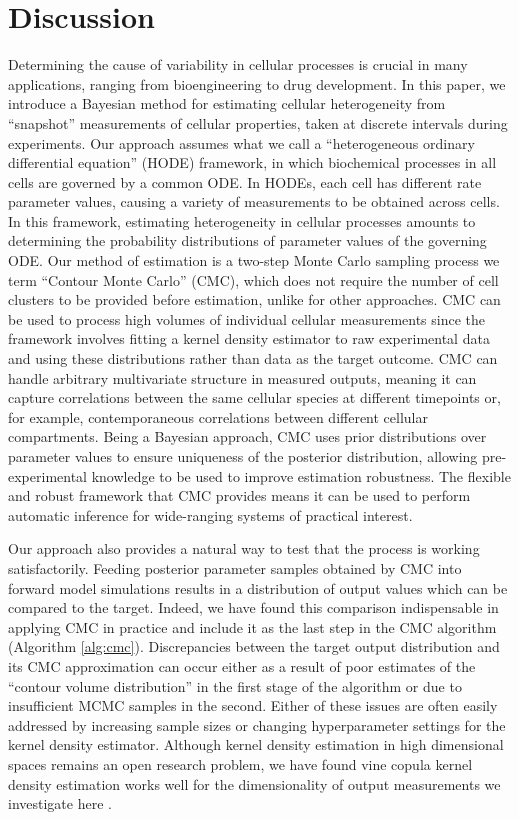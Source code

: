\section{Discussion}
\label{sec:discussion}
Determining the cause of variability in cellular processes is crucial in many applications, ranging from bioengineering to drug development. In this paper, we introduce a Bayesian method for estimating cellular heterogeneity from ``snapshot'' measurements of cellular properties, taken at discrete intervals during experiments. Our approach assumes what we call a ``heterogeneous ordinary differential equation'' (HODE) framework, in which biochemical processes in all cells are governed by a common ODE. In HODEs, each cell has different rate parameter values, causing a variety of measurements to be obtained across cells. In this framework, estimating heterogeneity in cellular processes amounts to determining the probability distributions of parameter values of the governing ODE. Our method of estimation is a two-step Monte Carlo sampling process we term ``Contour Monte Carlo'' (CMC), which does not require the number of cell clusters to be provided before estimation, unlike for other approaches. CMC can be used to process high volumes of individual cellular measurements since the framework involves fitting a kernel density estimator to raw experimental data and using these distributions rather than data as the target outcome. CMC can handle arbitrary multivariate structure in measured outputs, meaning it can capture correlations between the same cellular species at different timepoints or, for example, contemporaneous correlations between different cellular compartments. Being a Bayesian approach, CMC uses prior distributions over parameter values to ensure uniqueness of the posterior distribution, allowing pre-experimental knowledge to be used to improve estimation robustness. The flexible and robust framework that CMC provides means it can be used to perform automatic inference for wide-ranging systems of practical interest.

Our approach also provides a natural way to test that the process is working satisfactorily. Feeding posterior parameter samples obtained by CMC into forward model simulations results in a distribution of output values which can be compared to the target. Indeed, we have found this comparison indispensable in applying CMC in practice and include it as the last step in the CMC algorithm (Algorithm \ref{alg:cmc}). Discrepancies between the target output distribution and its CMC approximation can occur either as a result of poor estimates of the ``contour volume distribution'' in the first stage of the algorithm or due to insufficient MCMC samples in the second. Either of these issues are often easily addressed by increasing sample sizes or changing hyperparameter settings for the kernel density estimator. Although kernel density estimation in high dimensional spaces remains an open research problem, we have found vine copula kernel density estimation works well for the dimensionality of output measurements we investigate here \cite{nagler2016evading}.

